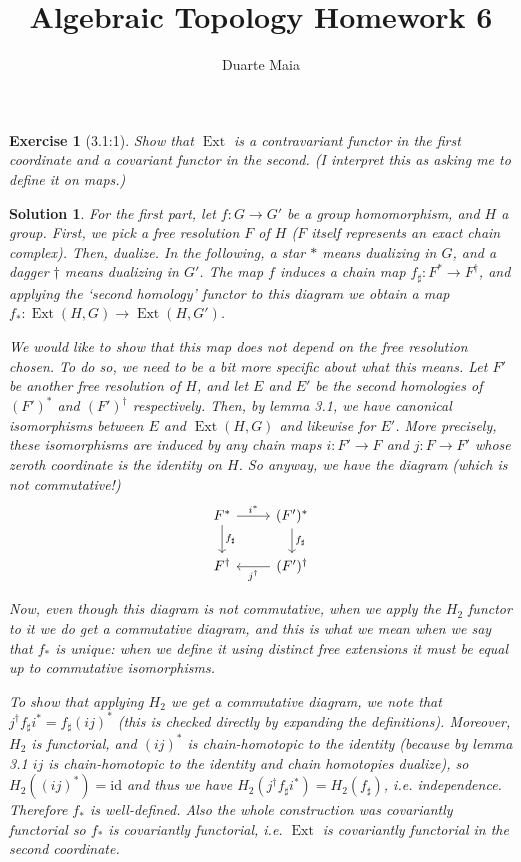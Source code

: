 \documentclass{article}
\title{Algebraic Topology Homework 6}
\author{Duarte Maia}
\theoremstyle{plain}
\newtheorem*{ex}{Exercise}
\theoremstyle{nonumberplain}
\newtheorem{sol}{Solution}
\newcommand{\id}{\mathrm{id}}
\DeclareMathOperator{\Ext}{Ext}
\begin{document}
\maketitle

\begin{ex}[3.1:1]
Show that $\Ext$ is a contravariant functor in the first coordinate and a covariant functor in the second. (I interpret this as asking me to define it on maps.)
\end{ex}

\begin{sol}
For the first part, let $f \colon G \to G'$ be a group homomorphism, and $H$ a group. First, we pick a free resolution $F$ of $H$ ($F$ itself represents an exact chain complex). Then, dualize. In the following, a star $*$ means dualizing in $G$, and a dagger $\dag$ means dualizing in $G'$. The map $f$ induces a chain map $f_\sharp \colon F^* \to F^\dag$, and applying the `second homology' functor to this diagram we obtain a map $f_* \colon \Ext(H,G) \to \Ext(H, G')$.

We would like to show that this map does not depend on the free resolution chosen. To do so, we need to be a bit more specific about what this means. Let $F'$ be another free resolution of $H$, and let $E$ and $E'$ be the second homologies of $(F')^*$ and $(F')^\dag$ respectively. Then, by lemma 3.1, we have canonical isomorphisms between $E$ and $\Ext(H,G)$ and likewise for $E'$. More precisely, these isomorphisms are induced by any chain maps $i \colon F' \to F$ and $j \colon F \to F'$ whose zeroth coordinate is the identity on $H$. So anyway, we have the diagram (which is not commutative!)
\[\begin{tikzcd}
F^* \arrow[d, "f_\sharp"] \arrow[r, "i^*"] & (F')^* \arrow[d, "f_\sharp"] \\
F^\dag                                     & (F')^\dag \arrow[l, "j^\dag"]
\end{tikzcd}\]

Now, even though this diagram is not commutative, when we apply the $H_2$ functor to it we do get a commutative diagram, and this is what we mean when we say that $f_*$ is unique: when we define it using distinct free extensions it must be equal up to commutative isomorphisms.

To show that applying $H_2$ we get a commutative diagram, we note that $j^\dag f_\sharp i^* = f_\sharp (ij)^*$ (this is checked directly by expanding the definitions). Moreover, $H_2$ is functorial, and $(ij)^*$ is chain-homotopic to the identity (because by lemma 3.1 $ij$ is chain-homotopic to the identity and chain homotopies dualize), so $H_2( (ij)^* ) = \id$ and thus we have $H_2(j^\dag f_\sharp i^*) = H_2(f_\sharp)$, i.e. independence. Therefore $f_*$ is well-defined. Also the whole construction was covariantly functorial so $f_*$ is covariantly functorial, i.e. $\Ext$ is covariantly functorial in the second coordinate.


\end{sol}
\end{document}

